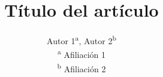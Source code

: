 \documentclass[11pt,a4paper,twocolumn]{article}
\title{\textbf{Título del artículo}}
\author{%
  Autor 1\textsuperscript{a}, Autor 2\textsuperscript{b}\\[2pt]
  \small
  \textsuperscript{a} Afiliación 1\\
  \textsuperscript{b} Afiliación 2
}
\date{}
\begin{document}
\twocolumn[
  
]








\end{document}
